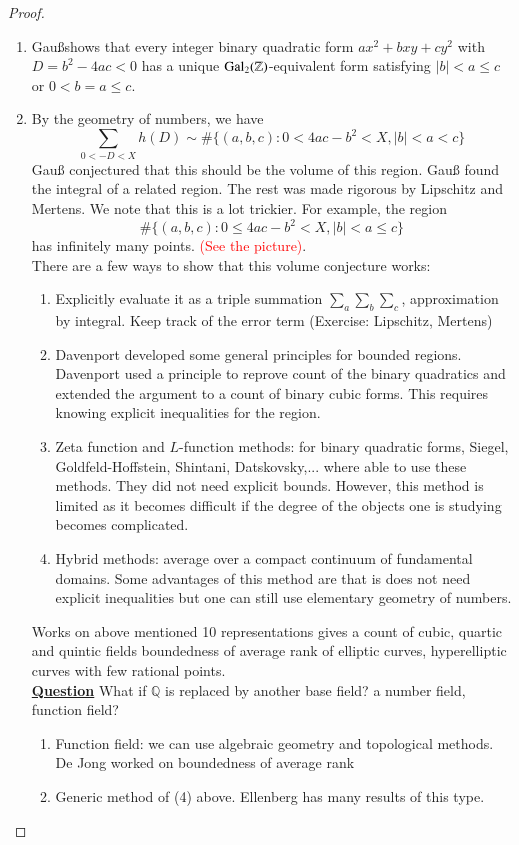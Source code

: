 \begin{proof}
\begin{enumerate}
\item Gau\ss shows that every integer binary quadratic form $ax^{2}+bxy+cy^{2}$ with $D=b^{2}-4ac < 0$ has a unique $\operatorname{Gal}_{2}(\mathbb{Z})$-equivalent form satisfying $|b| < a  \le c$ or $0 < b=a \le c$.
\item By the geometry of numbers, we have
\begin{equation*}
\sum_{0 < -D < X} h(D) \sim \#\{(a,b,c): 0 < 4ac-b^{2} < X, |b| < a < c\}
\end{equation*}
Gau\ss{} conjectured that this should be the volume of this region.  Gau\ss{} found the integral of a related region.  The rest was made rigorous by Lipschitz and Mertens.  We note that this is a lot trickier.  For example, the region
\begin{equation*}
\#\{(a,b,c): 0 \le 4ac-b^{2} < X, |b| < a \le c\}
\end{equation*}
has infinitely many points.  \textcolor{red}{(See the picture)}.\\
\indent There are a few ways to show that this volume conjecture works:
\begin{enumerate}
\item Explicitly evaluate it as a triple summation $\sum_{a}\sum_{b}\sum_{c}$, approximation by integral.  Keep track of the error term (Exercise:  Lipschitz, Mertens)
\item Davenport developed some general principles for bounded regions.  Davenport used a principle to reprove count of the binary quadratics and extended the argument to a count of binary cubic forms.  This requires knowing explicit inequalities for the region.
\item Zeta function and $L$-function methods:  for binary quadratic forms, Siegel, Goldfeld-Hoffstein, Shintani, Datskovsky,... where able to use these methods.  They did not need explicit bounds.  However, this method is limited as it becomes difficult if the degree of the objects one is studying becomes complicated.
\item Hybrid methods:  average over a compact continuum of fundamental domains.  Some advantages of this method are that is does not need explicit inequalities but one can still use elementary geometry of numbers.
\end{enumerate}
Works on above mentioned 10 representations gives a count of cubic, quartic and quintic fields boundedness of average rank of elliptic curves, hyperelliptic curves with few rational points.\\
\indent \underline{\textbf{Question}}  What if $\mathbb{Q}$ is replaced by another base field?  a number field, function field?
\begin{enumerate}
\item Function field:  we can use algebraic geometry and topological methods.  De Jong worked on boundedness of average rank 
\item Generic method of (4) above.  Ellenberg has many results of this type.
\end{enumerate}
\end{enumerate}
\end{proof}